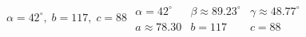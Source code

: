 { $\alpha = 42^{\circ}, \; b = 117, \; c = 88$}
{ $\begin{array}{lll}\alpha = 42^{\circ} & \beta \approx 89.23^{\circ} & \gamma \approx 48.77^{\circ} \\a \approx 78.30 & b = 117 & c = 88 \end{array}$}

